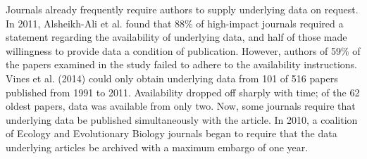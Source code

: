 \documentclass[10pt,a4paper,twocolumn]{article}
\begin{document}
Journals already frequently require authors to supply underlying data on request.
In 2011, Alsheikh-Ali et al. found that 88\% of high-impact journals required a statement regarding the availability of underlying data, and half of those made willingness to provide data a condition of publication\cite{alsheikh-ali_public_2011}.
However, authors of 59\% of the papers examined in the study failed to adhere to the availability instructions.
Vines et al. (2014) could only obtain underlying data from 101 of 516 papers published from 1991 to 2011\cite{vines_availability_2014}.
Availability dropped off sharply with time; of the 62 oldest papers, data was available from only two.
Now, some journals require that underlying data be published simultaneously with the article.
In 2010, a coalition of Ecology and Evolutionary Biology journals began to require that the data underlying articles be archived with a maximum embargo of one year\cite{whitlock_data_2010, fairbairn_advent_2011}.
\end{document}
